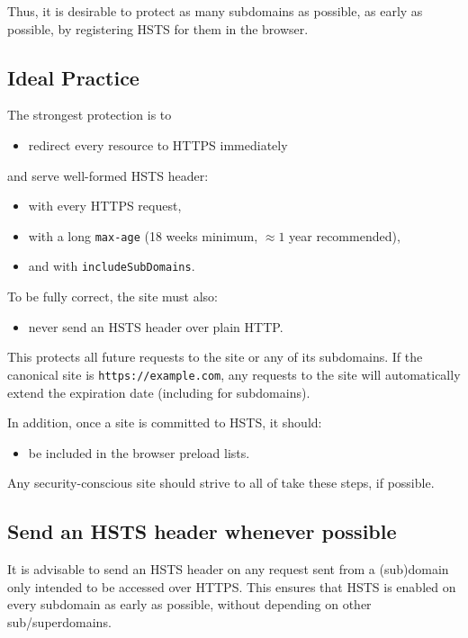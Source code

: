 \documentclass[conference]{./IEEEtran}
\newcommand{\site}[1]{\texttt{#1}}
\newcommand{\code}[1]{\texttt{#1}}
\newcommand{\iSD}{{\code{includeSubDomains}}}
\newcommand{\genericsite}{example.com}
\newcommand{\s}{{\site{https://\genericsite}}}
\theoremstyle{plain}
\begin{document}
Thus, it is desirable to protect as many subdomains as possible, as early as possible, by registering HSTS for them in the browser.

\subsection{Ideal Practice}


The strongest protection is to

\begin{itemize}
\item redirect every resource to HTTPS immediately
\end{itemize}

and serve well-formed  HSTS header:

\begin{itemize}
\item with every HTTPS request,
\item with a long \code{max-age} (18 weeks minimum, $\approx 1$ year recommended),
\item and with \iSD.
\end{itemize}

To be fully correct, the site must also:

\begin{itemize}
\item never send an HSTS header over plain HTTP.
\end{itemize}

This protects all future requests to the site or any of its subdomains. If the canonical site is \s, any requests to the site will automatically extend the expiration date (including for subdomains).

In addition, once a site is committed to HSTS, it should:
\begin{itemize}
\item be included in the browser preload lists.
\end{itemize}

Any security-conscious site should strive to all of take these steps, if possible.

\subsection{Send an HSTS header whenever possible}

It is advisable to send an HSTS header on any request sent from a (sub)domain only intended to be accessed over HTTPS. This ensures that HSTS is enabled on every subdomain as early as possible, without depending on other sub/superdomains.
\end{document}
